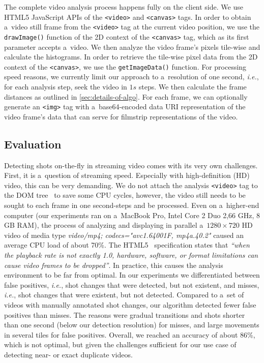 The complete video analysis process happens fully
on the client side.
We use HTML5 JavaScript APIs of the \texttt{<video>} and
\texttt{<canvas>} tags.
In order to obtain a~video still frame
from the \texttt{<video>} tag at the current video position,
we use the \texttt{drawImage()} function of the 2D context of the
\texttt{<canvas>} tag,
which as its first parameter accepts a~video.
We then analyze the video frame's pixels tile-wise
and calculate the histograms.
In order to retrieve the tile-wise pixel data
from the 2D context of the \texttt{<canvas>},
we use the \texttt{getImageData()} function.
For processing speed reasons, we currently limit our approach to
a~resolution of one second, \emph{i.e.},
for each analysis step,
seek the video in $\mathit{1s}$ steps.
We then calculate the frame distances as outlined in
\autoref{sec:details-of-algo}.
For each frame, we can optionally generate an \texttt{<img>} tag
with a~base64-encoded data URI representation
of the video frame's data
that can serve for filmstrip representations of the video.

\subsection{Evaluation} \label{sec:evaluation}

Detecting shots on-the-fly in streaming video
comes with its very own challenges.
First, it is a~question of streaming speed.
Especially with high-definition (HD) video,
this can be very demanding.
We do not attach the analysis \texttt{<video>} tag
to the DOM tree~\cite{lehors2004dom} to save some CPU cycles,
however, the video still needs to be sought to each frame
in one second-steps and be processed.
Even on a~higher-end computer (our experiments ran on a~MacBook
Pro, Intel Core 2 Duo 2,66 GHz, 8 GB RAM),
the process of analyzing and displaying in parallel
a~$\mathit{1280} \times \mathit{720}$ HD video of media type
\emph{video/mp4; codecs="avc1.64001F, mp4a.40.2"}
caused an average CPU load of about 70\%.
The HTML5~\cite{berjon2012html5} specification states that
\textit{``when the playback rate is not exactly 1.0,
hardware, software, or format limitations can cause video frames
to be dropped''}.
In practice, this causes the analysis environment
to be far from optimal.
In our experiments we differentiated between false positives,
\emph{i.e.}, shot changes that were detected,
but not existent, and misses, \emph{i.e.},
shot changes that were existent,
but not detected.
Compared to a~set of videos with manually annotated shot changes,
our algorithm detected fewer false positives than misses.
The reasons were gradual transitions and shots
shorter than one second (below our detection resolution)
for misses, and large movements in several tiles
for false positives.
Overall, we reached an accuracy of about 86\%,
which is not optimal, but given the challenges
sufficient for our use case of
detecting near- or exact duplicate videos. 

